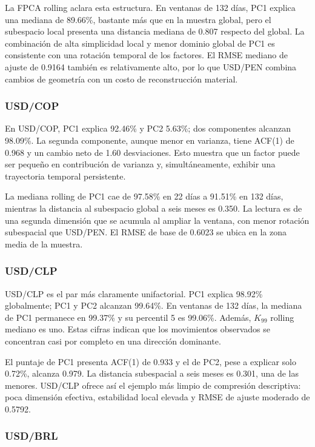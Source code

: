 \documentclass[a4paper,11pt]{article}
\begin{document}
La FPCA rolling aclara esta estructura. En ventanas de 132 días, PC1 explica una mediana de 89.66\%, bastante más que en la muestra global, pero el subespacio local presenta una distancia mediana de 0.807 respecto del global. La combinación de alta simplicidad local y menor dominio global de PC1 es consistente con una rotación temporal de los factores. El RMSE mediano de ajuste de 0.9164 también es relativamente alto, por lo que USD/PEN combina cambios de geometría con un costo de reconstrucción material.

\subsubsection{USD/COP}

En USD/COP, PC1 explica 92.46\% y PC2 5.63\%; dos componentes alcanzan 98.09\%. La segunda componente, aunque menor en varianza, tiene ACF(1) de 0.968 y un cambio neto de 1.60 desviaciones. Esto muestra que un factor puede ser pequeño en contribución de varianza y, simultáneamente, exhibir una trayectoria temporal persistente.

La mediana rolling de PC1 cae de 97.58\% en 22 días a 91.51\% en 132 días, mientras la distancia al subespacio global a seis meses es 0.350. La lectura es de una segunda dimensión que se acumula al ampliar la ventana, con menor rotación subespacial que USD/PEN. El RMSE de base de 0.6023 se ubica en la zona media de la muestra.

\subsubsection{USD/CLP}

USD/CLP es el par más claramente unifactorial. PC1 explica 98.92\% globalmente; PC1 y PC2 alcanzan 99.64\%. En ventanas de 132 días, la mediana de PC1 permanece en 99.37\% y su percentil 5 es 99.06\%. Además, \(K_{99}\) rolling mediano es uno. Estas cifras indican que los movimientos observados se concentran casi por completo en una dirección dominante.

El puntaje de PC1 presenta ACF(1) de 0.933 y el de PC2, pese a explicar solo 0.72\%, alcanza 0.979. La distancia subespacial a seis meses es 0.301, una de las menores. USD/CLP ofrece así el ejemplo más limpio de compresión descriptiva: poca dimensión efectiva, estabilidad local elevada y RMSE de ajuste moderado de 0.5792.

\subsubsection{USD/BRL}
\end{document}
